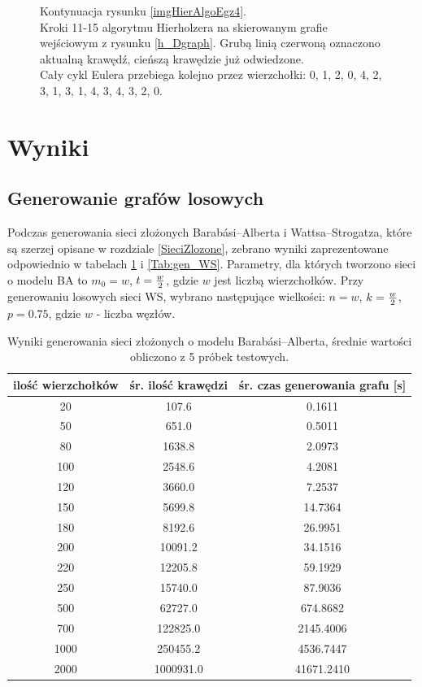 \documentclass[a4paper, 12pt, twoside, openright]{article}
\begin{document}
\begin{figure}[p]
		\caption[]{Kontynuacja rysunku \ref{imgHierAlgoEgz4}.\\Kroki 11-15 algorytmu Hierholzera na skierowanym grafie wejściowym z rysunku \ref{h_Dgraph}. Grubą linią czerwoną oznaczono aktualną krawędź, cieńszą krawędzie już odwiedzone. \\Cały cykl Eulera przebiega kolejno przez wierzchołki: 0, 1, 2, 0, 4, 2, 3, 1, 3, 1, 4, 3, 4, 3, 2, 0.}
		\label{imgHierAlgoEgz5}
	\end{figure}	
\newpage
\newpage
\section{Wyniki}
\subsection{Generowanie grafów losowych}
\indent\par
Podczas generowania sieci złożonych Barabási–Alberta i Wattsa–Strogatza, które są szerzej opisane w rozdziale \ref{SieciZlozone}, zebrano wyniki zaprezentowane odpowiednio w tabelach \ref{Tab:gen_BA} i \ref{Tab:gen_WS}. Parametry, dla których tworzono sieci o modelu BA to $m_0 = w$, $t = {w\over2}$, gdzie $w$ jest liczbą wierzchołków. Przy generowaniu losowych sieci WS, wybrano następujące wielkości: $n = w$, $k = {w\over2}$, $p=0.75$, gdzie $w$ - liczba węzłów.

\begin{table}[ht]
	\centering
	\caption{Wyniki generowania sieci złożonych o modelu Barabási–Alberta, średnie wartości obliczono z 5 próbek testowych.}
	\resizebox{14.5cm}{!}
	{
	\begin{tabular}{|c c c|}
		\hline
		ilość wierzchołków	& śr. ilość krawędzi 		& śr. czas generowania grafu [s]\\ \hline \hline
		20 	& 107.6 		& 0.1611 	\\ \hline
		50 	& 651.0 		& 0.5011 	\\ \hline
		80 	& 1638.8        & 2.0973	\\ \hline
		100 & 2548.6        & 4.2081	\\ \hline
		120 & 3660.0        & 7.2537	\\ \hline
		150 & 5699.8   		& 14.7364	\\ \hline
		180 & 8192.6        & 26.9951	\\ \hline
		200 & 10091.2 		& 34.1516	\\ \hline
		220 & 12205.8 		& 59.1929	\\ \hline
		250 & 15740.0 		& 87.9036	\\ \hline
		500 & 62727.0 		& 674.8682	\\ \hline				
		700 & 122825.0      & 2145.4006	\\ \hline
		1000& 250455.2	    & 4536.7447 \\ \hline
		2000& 1000931.0    	& 41671.2410\\ \hline
	\end{tabular} 
	}
	\label{Tab:gen_BA}
\end{table}
\end{document}

